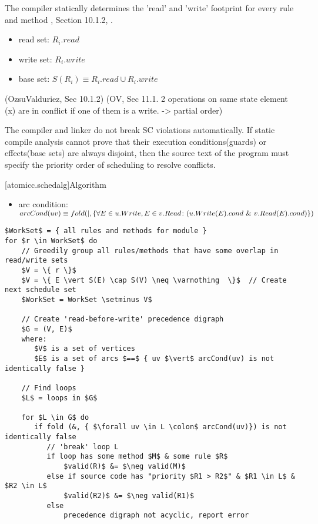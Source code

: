The compiler statically determines the 'read' and 'write'
footprint for every rule and method \cite{OV11}, Section 10.1.2, \cite{doi:10.1137/0213032}.
\begin{itemize}
\item read set: $R_{i}.read$
\item write set: $R_{i}.write$
\item base set: $S(R_{i}) \equiv R_{i}.read \cup R_{i}.write$
\end{itemize}
(OzsuValduriez, Sec 10.1.2)
(OV, Sec 11.1.  2 operations on same state element (x) are in conflict if
one of them is a write. -> partial order)

The compiler and linker do not break SC violations automatically.
If static compile analysis cannot prove that their execution conditions(guards) or
effects(base sets) are always disjoint,
then the source text of the program must specify the priority order of scheduling
to resolve conflicts.

[atomicc.schedalg]{Algorithm}
\begin{itemize}
\item arc condition: $arcCond(uv) \equiv
\newline
      fold (|, \{ \forall E \in u.Write, E \in v.Read \colon (u.Write(E).cond\ \&\ v.Read(E).cond) \})$
\end{itemize}

\begin{lstlisting}[mathescape=true]
$WorkSet$ = { all rules and methods for module }
for $r \in WorkSet$ do
    // Greedily group all rules/methods that have some overlap in read/write sets
    $V = \{ r \}$
    $V = \{ E \vert S(E) \cap S(V) \neq \varnothing  \}$  // Create next schedule set
    $WorkSet = WorkSet \setminus V$

    // Create 'read-before-write' precedence digraph
    $G = (V, E)$
    where: 
       $V$ is a set of vertices
       $E$ is a set of arcs $==$ { uv $\vert$ arcCond(uv) is not identically false }

    // Find loops
    $L$ = loops in $G$

    for $L \in G$ do
       if fold (&, { $\forall uv \in L \colon$ arcCond(uv)}) is not identically false
          // 'break' loop L
          if loop has some method $M$ & some rule $R$
              $valid(R)$ &= $\neg valid(M)$
          else if source code has "priority $R1 > R2$" & $R1 \in L$ & $R2 \in L$
              $valid(R2)$ &= $\neg valid(R1)$
          else
              precedence digraph not acyclic, report error
\end{lstlisting}

